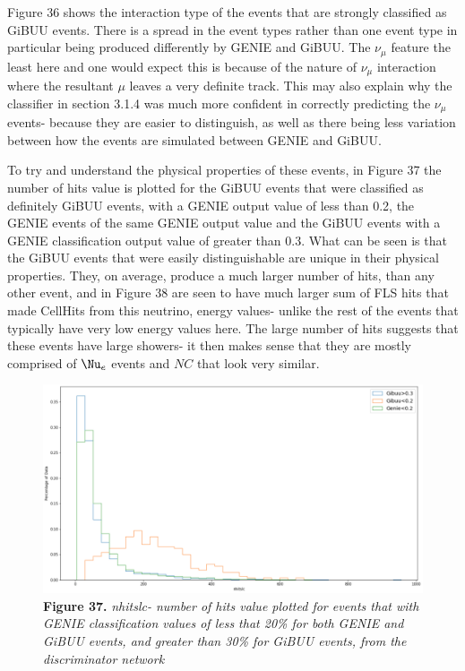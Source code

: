 \noindent Figure 36 shows the interaction type of the events that are strongly classified as GiBUU events. There is a spread in the event types rather than one event type in particular being produced differently by GENIE and GiBUU. The $\nu_\mu$ feature the least here and one would expect this is because of the nature of $\nu_\mu$ interaction where the resultant $\mu$ leaves a very definite track. This may also explain why the classifier in section 3.1.4 was much more confident in correctly predicting the $\nu_\mu$ events- because they are easier to distinguish, as well as there being less variation between how the events are simulated between GENIE and GiBUU. \medskip

To try and understand the physical properties of these events, in Figure 37 the number of hits value is plotted for the GiBUU events that were classified as definitely GiBUU events, with a GENIE output value of less than 0.2, the GENIE events of the same GENIE output value and the GiBUU events with a GENIE classification output value of greater than 0.3. What can be seen is that the GiBUU events that were easily distinguishable are unique in their physical properties. They, on average, produce a much larger number of hits, than any other event, and in Figure 38 are seen to have much larger sum of FLS hits that made CellHits from this neutrino, energy values- unlike the rest of the events that typically have very low energy values here. The large number of hits suggests that these events have large showers- it then makes sense that they are mostly comprised of $\Nu_e$ events and $NC$ that look very similar.


\begin{figure}[t!]
 \centering
 \includegraphics[width=160mm]{Descr/nhits.png}
 \textbf{Figure 37.} \textit{nhitslc- number of hits value plotted for events that with GENIE classification values of less that 20\% for both GENIE and GiBUU events, and greater than 30\% for GiBUU events, from the discriminator network}
\end{figure}

